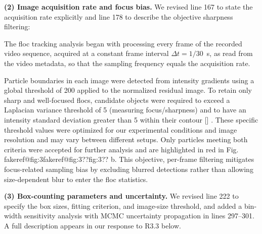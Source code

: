 \documentclass[11pt]{article}
\makeatletter
\newenvironment{Snippet}{%
  \par\vspace{0.3em}\begin{list}{}{\setlength{\leftmargin}{1em}\setlength{\rightmargin}{0.5em}}\item\small\itshape
}{%
  \end{list}\vspace{0.3em}
}
\newcommand{\fakeref}[1]{%
  \ifcsname fakeref@#1\endcsname\csname fakeref@#1\endcsname\else ??#1??\fi
}
\renewcommand{\ref}[1]{\fakeref{#1}}%
\newcommand{\citelookup}[1]{%
  \ifcsname cite@#1\endcsname\csname cite@#1\endcsname\else #1\fi
}
\newcommand{\citeformat}[1]{%
  \def\citelist{}%
  \forcsvlist{\addtocitelist}{#1}%
  \textup{[\citelist]}%
}
\newcommand{\addtocitelist}[1]{%
  \ifx\citelist\empty
    \edef\citelist{\citelookup{#1}}%
  \else
    \edef\citelist{\citelist;\space\citelookup{#1}}%
  \fi
}
\renewcommand{\cite}[1]{\citeformat{#1}}
\makeatother
\begin{document}
\begin{enumerate}[label=\textbf{R1.\arabic*.}]
\textbf{(2) Image acquisition rate and focus bias.} We revised line 167 to state the acquisition rate explicitly and line 178 to describe the objective sharpness filtering:
\begin{Snippet}
The floc tracking analysis began with processing every frame of the recorded video sequence, acquired at a constant frame interval $\Delta t = 1/30$~s, as read from the video metadata, so that the sampling frequency equals the acquisition rate.
\end{Snippet}
\begin{Snippet}
Particle boundaries in each image were detected from intensity gradients using a global threshold of 200 applied to the normalized residual image. To retain only sharp and well-focused flocs, candidate objects were required to exceed a Laplacian variance threshold of 5 (measuring focus/sharpness) and to have an intensity standard deviation greater than 5 within their contour \cite{pertuz2013analysis}. These specific threshold values were optimized for our experimental conditions and image resolution and may vary between different setups. Only particles meeting both criteria were accepted for further analysis and are highlighted in red in Fig.~\ref{fig:3}b. This objective, per-frame filtering mitigates focus-related sampling bias by excluding blurred detections rather than allowing size-dependent blur to enter the floc statistics.
\end{Snippet}

\textbf{(3) Box-counting parameters and uncertainty.} We revised line 222 to specify the box sizes, fitting criterion, and image-size threshold, and added a bin-width sensitivity analysis with MCMC uncertainty propagation in lines 297--301. A full description appears in our response to R3.3 below.


\end{enumerate}
\end{document}
